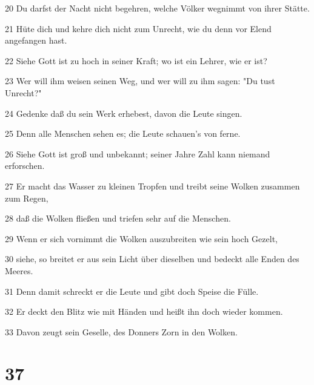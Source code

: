 \par 20 Du darfst der Nacht nicht begehren, welche Völker wegnimmt von ihrer Stätte.
\par 21 Hüte dich und kehre dich nicht zum Unrecht, wie du denn vor Elend angefangen hast.
\par 22 Siehe Gott ist zu hoch in seiner Kraft; wo ist ein Lehrer, wie er ist?
\par 23 Wer will ihm weisen seinen Weg, und wer will zu ihm sagen: "Du tust Unrecht?"
\par 24 Gedenke daß du sein Werk erhebest, davon die Leute singen.
\par 25 Denn alle Menschen sehen es; die Leute schauen's von ferne.
\par 26 Siehe Gott ist groß und unbekannt; seiner Jahre Zahl kann niemand erforschen.
\par 27 Er macht das Wasser zu kleinen Tropfen und treibt seine Wolken zusammen zum Regen,
\par 28 daß die Wolken fließen und triefen sehr auf die Menschen.
\par 29 Wenn er sich vornimmt die Wolken auszubreiten wie sein hoch Gezelt,
\par 30 siehe, so breitet er aus sein Licht über dieselben und bedeckt alle Enden des Meeres.
\par 31 Denn damit schreckt er die Leute und gibt doch Speise die Fülle.
\par 32 Er deckt den Blitz wie mit Händen und heißt ihn doch wieder kommen.
\par 33 Davon zeugt sein Geselle, des Donners Zorn in den Wolken.

\chapter{37}

